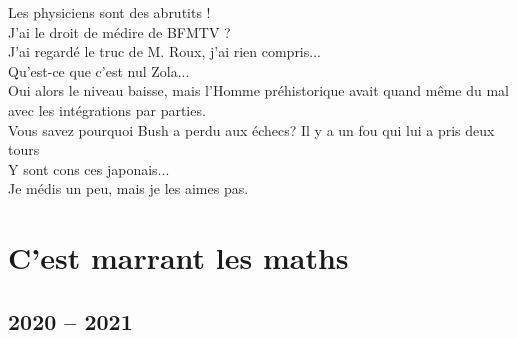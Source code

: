 \documentclass[french, a4paper, openany]{book}
\begin{document}
	\noindent \og Les physiciens sont des abrutits ! \fg \\
	\og J'ai le droit de médire de BFMTV ? \fg \\
	\og J'ai regardé le truc de M. Roux, j'ai rien compris... \fg \\
	\og Qu'est-ce que c'est nul Zola... \fg \\
	\og Oui alors le niveau baisse, mais l'Homme préhistorique avait quand même du mal avec les intégrations par parties. \fg \\
	\og Vous savez pourquoi Bush a perdu aux échecs? Il y a un fou qui lui a pris deux tours \fg \\
	\og Y sont cons ces japonais... \fg \\
	\og Je médis un peu, mais je les aimes pas. \fg \\

\chapter{C'est marrant les maths}

\section{2020 -- 2021}
\end{document}
